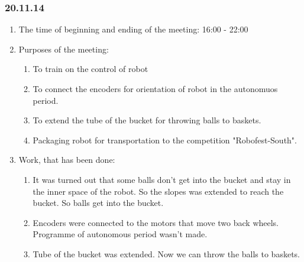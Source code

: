 \subsubsection{20.11.14}

\begin{enumerate}
	\item The time of beginning and ending of the meeting:
	16:00 - 22:00
	\item Purposes of the meeting:
	\begin{enumerate}
	  \item To train on the control of robot
	  
	  \item To connect the encoders for orientation of robot in the autonomuos period.
	  
	  \item To extend the tube of the bucket for throwing balls to baskets.
	  
	  \item Packaging robot for transportation to the competition "Robofest-South".
	  
    \end{enumerate}
	\item Work, that has been done:
	\begin{enumerate}
	  \item It was turned out that some balls don't get into the bucket and stay in the inner space of the robot. So the slopes was extended to reach the bucket. So balls get into the bucket.
	  
      
      \item Encoders were connected to the motors that move two back wheels. Programme of autonomous period wasn't made.
      
      \item Tube of the bucket was extended. Now we can throw the balls to baskets.
      

\end{enumerate}
\end{enumerate}
